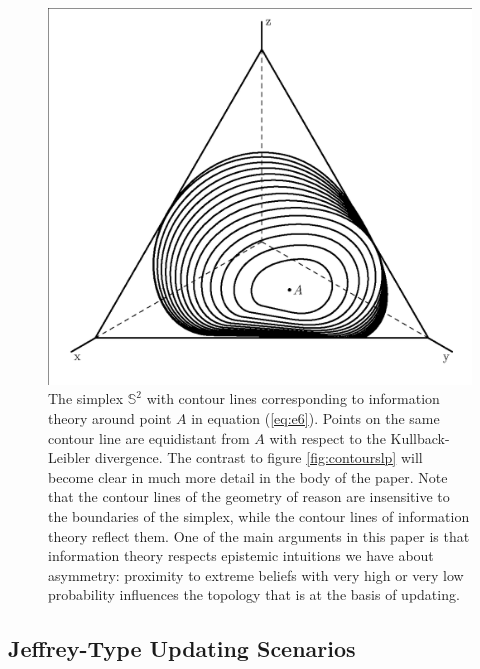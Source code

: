 \documentclass[12pt]{article}
\begin{document}
\begin{figure}[H]
  \begin{flushright}
    \begin{minipage}[h]{.7\linewidth}
      \includegraphics[width=\textwidth]{crj.eps}
      \caption{\footnotesize The simplex $\mathbb{S}^{2}$ with contour
        lines corresponding to information theory around point $A$ in
        equation (\ref{eq:e6}). Points on the same contour line are
        equidistant from $A$ with respect to the Kullback-Leibler
        divergence. The contrast to figure \ref{fig:contourslp} will
        become clear in much more detail in the body of the paper.
        Note that the contour lines of the geometry of reason are
        insensitive to the boundaries of the simplex, while the
        contour lines of information theory reflect them. One of the
        main arguments in this paper is that information theory
        respects epistemic intuitions we have about asymmetry:
        proximity to extreme beliefs with very high or very low
        probability influences the topology that is at the basis of
        updating.}
      \label{fig:contoursrj}
    \end{minipage}
  \end{flushright}
\end{figure}

\subsection{Jeffrey-Type Updating Scenarios}
\label{subsec:aixoezae}
\end{document}
